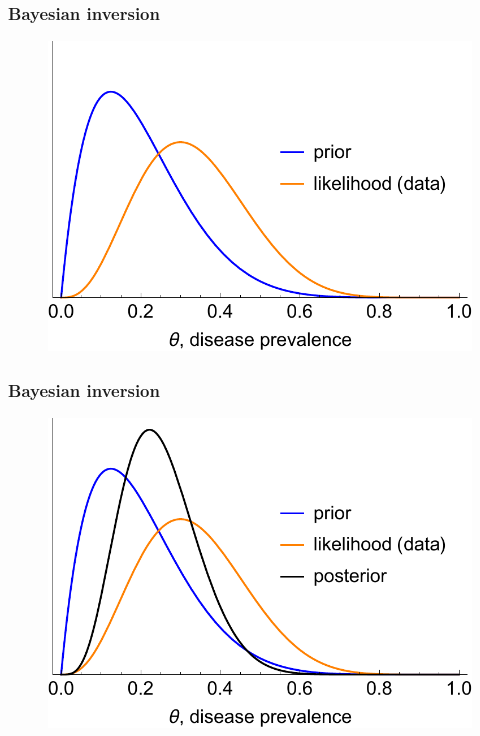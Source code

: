 \documentclass[handout]{beamer}
\begin{document}
\begin{frame}
	\frametitle{Bayesian inversion}
	
	\begin{figure}[ht]
		\centerline{\includegraphics[width=\textwidth]{figures/binomial_likelihood.pdf}}
	\end{figure}
	
\end{frame}

\begin{frame}
	\frametitle{Bayesian inversion}
	
	\begin{figure}[ht]
		\centerline{\includegraphics[width=\textwidth]{figures/binomial_posterior.pdf}}
	\end{figure}
	
\end{frame}
\end{document}
